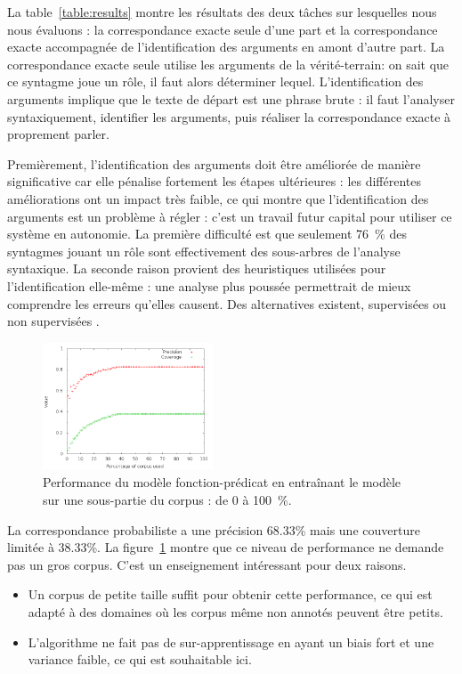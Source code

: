 La table~\ref{table:results} montre les résultats des deux tâches sur
lesquelles nous nous évaluons : la correspondance exacte seule d'une part et la
correspondance exacte accompagnée de l'identification des arguments en amont
d'autre part. La correspondance exacte seule utilise les arguments de la
vérité-terrain: on sait que ce syntagme joue un rôle, il faut alors déterminer
lequel.  L'identification des arguments implique que le texte de départ est une
phrase brute : il faut l'analyser syntaxiquement, identifier les arguments,
puis réaliser la correspondance exacte à proprement parler.

Premièrement, l'identification des arguments doit être améliorée de manière
significative car elle pénalise fortement les étapes ultérieures : les
différentes améliorations ont un impact très faible, ce qui montre que
l'identification des arguments est un problème à régler : c'est un travail
futur capital pour utiliser ce système en autonomie. La première difficulté est
que seulement 76~\% des syntagmes jouant un rôle sont effectivement des
sous-arbres de l'analyse syntaxique.  La seconde raison provient des
heuristiques utilisées pour l'identification elle-même : une analyse plus
poussée permettrait de mieux comprendre les erreurs qu'elles causent. Des
alternatives existent, supervisées ou non supervisées
\citep{abend2009unsupervised}.

\begin{figure}[t]
    \centering
    \includegraphics[width=0.45\textwidth]{fig/slot-predicate-percents.png}
    \caption{\label{fig:fonction_predicate}Performance du modèle fonction-prédicat en entraînant le modèle sur une sous-partie du corpus : de 0 à 100~\%.}
\end{figure}

La correspondance probabiliste a une précision 68.33\% mais une couverture
limitée à 38.33\%. La figure~\ref{fig:fonction_predicate} montre que ce niveau
de performance ne demande pas un gros corpus. C'est un enseignement intéressant
pour deux raisons.

\begin{itemize}

    \item Un corpus de petite taille suffit pour obtenir cette performance, ce
    qui est adapté à des domaines où les corpus même non annotés peuvent être
    petits.

    \item L'algorithme ne fait pas de sur-apprentissage en ayant un biais fort
    et une variance faible, ce qui est souhaitable ici.

\end{itemize}

